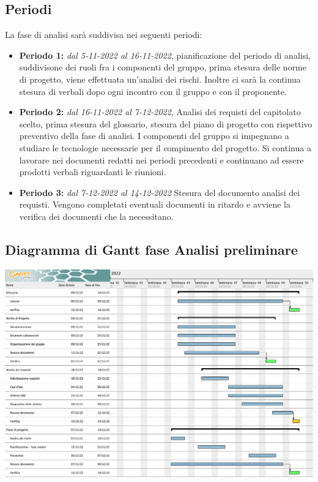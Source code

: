 \subsection{Periodi}
La fase di analisi sarà suddivisa nei seguenti periodi:
\begin{itemize}
\item \textbf{Periodo 1:} \textit{dal 5-11-2022 al 16-11-2022},  pianificazione del periodo di analisi,  suddivisone dei ruoli fra i componenti del gruppo,  prima stesura delle norme di progetto, viene effettuata un'analisi dei rischi.  Inoltre ci sarà la continua stesura di verbali dopo ogni incontro con il gruppo e con il proponente.
\item \textbf{Periodo 2:} \textit{dal 16-11-2022 al 7-12-2022},  Analisi dei requisti del capitolato scelto,  prima stesura del glossario, stesura del piano di progetto con rispettivo preventivo della fase di analisi.  I componenti del gruppo si impegnano a studiare le tecnologie necessarie per il compimento del progetto. Si continua a lavorare nei documenti redatti nei periodi precedenti e continuano ad essere prodotti verbali riguardanti le riunioni.
\item \textbf{Periodo 3: } \textit{dal 7-12-2022 al 14-12-2022} Stesura del documento analisi dei requisti. Vengono completati eventuali documenti in ritardo e avviene la verifica dei documenti che la necessitano.
\end{itemize}

\subsection{Diagramma di Gantt fase Analisi preliminare}
\includegraphics[scale=0.38]{image/analisi_preliminare_gantt.png}
